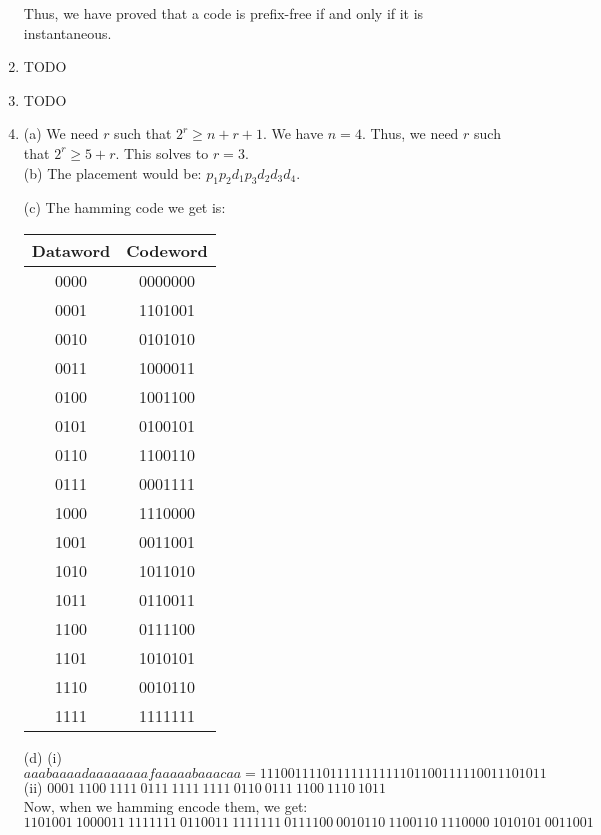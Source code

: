 \documentclass[a4paper]{article}
\begin{document}
\begin{enumerate}
Thus, we have proved that a code is prefix-free if and only if it is instantaneous.

\item TODO
\item TODO
\newpage 

\item (a) We need $r$ such that $2^r \geq n + r + 1$. We have $n = 4$. Thus, we need $r$ such that $2^r \geq 5 + r$. This solves to $r = 3$.\\

(b) The placement would be: $p_1 p_2 d_1 p_3 d_2 d_3 d_4$.

(c) The hamming code we get is:\\
\begin{longtable}[c]{| c | c |}
Dataword & Codeword\\
\hline
0000 & 0000000\\
0001 & 1101001\\
0010 & 0101010\\
0011 & 1000011\\
0100 & 1001100\\
0101 & 0100101\\
0110 & 1100110\\
0111 & 0001111\\
1000 & 1110000\\
1001 & 0011001\\
1010 & 1011010\\
1011 & 0110011\\
1100 & 0111100\\
1101 & 1010101\\
1110 & 0010110\\
1111 & 1111111
\end{longtable}

(d) (i) $aaabaaaadaaaaaaaafaaaaabaaacaa = 11100111101111111111101100111110011101011$\\
(ii) $0001\ 1100\ 1111\ 0111\ 1111\ 1111\ 0110\ 0111\ 1100\ 1110\ 1011$\\
Now, when we hamming encode them, we get:\\
$1101001\ 1000011\ 1111111\ 0110011\ 1111111\ 0111100\ 0010110\ 1100110\ 1110000\ 1010101\ 0011001$\\

\end{enumerate} 
\end{document}
